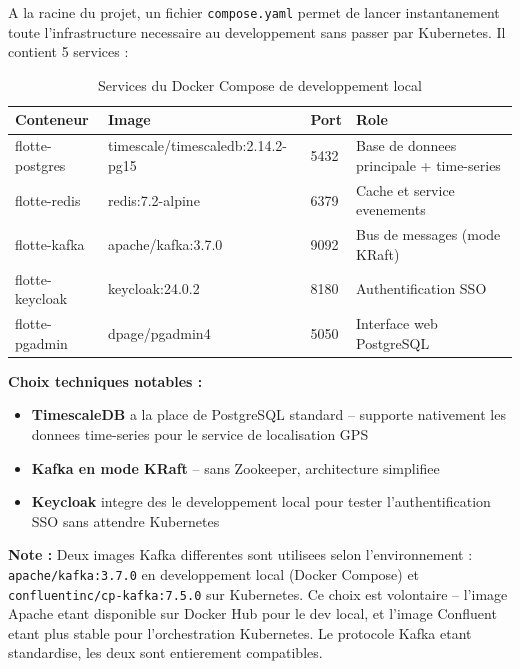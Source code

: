 \documentclass[12pt,a4paper]{article}
\begin{document}
\vspace{0.3cm}

A la racine du projet, un fichier \texttt{compose.yaml} permet de lancer
instantanement toute l'infrastructure necessaire au developpement sans passer par
Kubernetes. Il contient 5 services :

\begin{table}[H]
  \centering
  \begin{tabular}{llll}
    \toprule
    \textbf{Conteneur} & \textbf{Image} & \textbf{Port} & \textbf{Role} \\
    \midrule
    flotte-postgres  & timescale/timescaledb:2.14.2-pg15    & 5432 & Base de donnees principale + time-series \\
    flotte-redis     & redis:7.2-alpine                     & 6379 & Cache et service evenements \\
    flotte-kafka     & apache/kafka:3.7.0                   & 9092 & Bus de messages (mode KRaft) \\
    flotte-keycloak  & keycloak:24.0.2  & 8180 & Authentification SSO \\
    flotte-pgadmin   & dpage/pgadmin4                       & 5050 & Interface web PostgreSQL \\
    \bottomrule
  \end{tabular}
  \caption{Services du Docker Compose de developpement local}
\end{table}

\textbf{Choix techniques notables :}
\begin{itemize}
  \item \textbf{TimescaleDB} a la place de PostgreSQL standard -- supporte nativement
        les donnees time-series pour le service de localisation GPS
  \item \textbf{Kafka en mode KRaft} -- sans Zookeeper, architecture simplifiee
  \item \textbf{Keycloak} integre des le developpement local pour tester
        l'authentification SSO sans attendre Kubernetes
\end{itemize}

\begin{infobox}
\textbf{Note :} Deux images Kafka differentes sont utilisees selon l'environnement :
\texttt{apache/kafka:3.7.0} en developpement local (Docker Compose) et
\texttt{confluentinc/cp-kafka:7.5.0} sur Kubernetes. Ce choix est volontaire --
l'image Apache etant disponible sur Docker Hub pour le dev local, et l'image
Confluent etant plus stable pour l'orchestration Kubernetes. Le protocole Kafka
etant standardise, les deux sont entierement compatibles.
\end{infobox}
\end{document}
